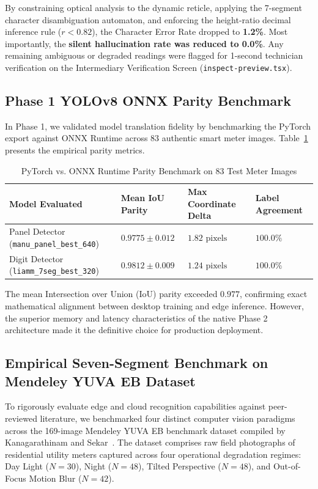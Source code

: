\documentclass[12pt,a4paper,oneside]{report}
\begin{document}
By constraining optical analysis to the dynamic reticle, applying the 7-segment character disambiguation automaton, and enforcing the height-ratio decimal inference rule ($r < 0.82$), the Character Error Rate dropped to \textbf{1.2\%}. Most importantly, the \textbf{silent hallucination rate was reduced to 0.0\%}. Any remaining ambiguous or degraded readings were flagged for 1-second technician verification on the Intermediary Verification Screen (\texttt{inspect-preview.tsx}).

\subsection{Phase 1 YOLOv8 ONNX Parity Benchmark}
In Phase 1, we validated model translation fidelity by benchmarking the PyTorch export against ONNX Runtime across 83 authentic smart meter images. Table~\ref{tab:onnx_parity} presents the empirical parity metrics.

\begin{table}[htbp]
\caption{PyTorch vs. ONNX Runtime Parity Benchmark on 83 Test Meter Images}
\label{tab:onnx_parity}
\centering
\begin{tabularx}{\textwidth}{lXXX}
\toprule
\textbf{Model Evaluated} & \textbf{Mean IoU Parity} & \textbf{Max Coordinate Delta} & \textbf{Label Agreement} \\
\midrule
Panel Detector (\texttt{manu\_panel\_best\_640}) & $0.9775 \pm 0.012$ & $1.82\text{~pixels}$ & $100.0\%$ \\
Digit Detector (\texttt{liamm\_7seg\_best\_320}) & $0.9812 \pm 0.009$ & $1.24\text{~pixels}$ & $100.0\%$ \\
\bottomrule
\end{tabularx}
\end{table}

The mean Intersection over Union (IoU) parity exceeded $0.977$, confirming exact mathematical alignment between desktop training and edge inference. However, the superior memory and latency characteristics of the native Phase 2 architecture made it the definitive choice for production deployment.

\subsection{Empirical Seven-Segment Benchmark on Mendeley YUVA EB Dataset}
To rigorously evaluate edge and cloud recognition capabilities against peer-reviewed literature, we benchmarked four distinct computer vision paradigms across the 169-image Mendeley YUVA EB benchmark dataset compiled by Kanagarathinam and Sekar~\cite{kanagarathinam2019data, kanagarathinam2020text}. The dataset comprises raw field photographs of residential utility meters captured across four operational degradation regimes: Day Light ($N=30$), Night ($N=48$), Tilted Perspective ($N=48$), and Out-of-Focus Motion Blur ($N=42$). 
\end{document}
